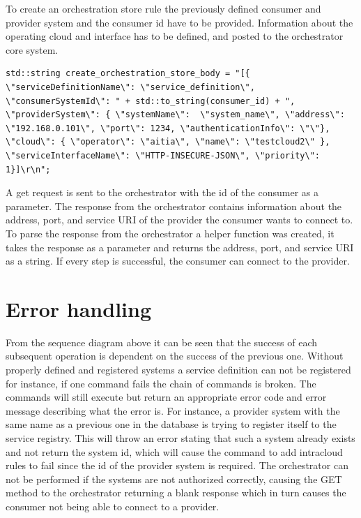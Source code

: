 To create an orchestration store rule the previously defined consumer and provider system and the consumer id have to be provided. 
Information about the operating cloud and interface has to be defined, and posted to the orchestrator core system.
\begin{lstlisting}[style=CStyle]
std::string create_orchestration_store_body = "[{ \"serviceDefinitionName\": \"service_definition\", \"consumerSystemId\": " + std::to_string(consumer_id) + ", \"providerSystem\": { \"systemName\":  \"system_name\", \"address\": \"192.168.0.101\", \"port\": 1234, \"authenticationInfo\": \"\"}, \"cloud\": { \"operator\": \"aitia\", \"name\": \"testcloud2\" }, \"serviceInterfaceName\": \"HTTP-INSECURE-JSON\", \"priority\": 1}]\r\n";
\end{lstlisting}
A get request is sent to the orchestrator with the id of the consumer as a parameter.
The response from the orchestrator contains information about the address, port, and service URI of the provider the consumer wants to connect to.
To parse the response from the orchestrator a helper function was created, it takes the response as a parameter and returns the address, port, and service URI as a string.
If every step is successful, the consumer can connect to the provider.

\section{Error handling}
From the sequence diagram above it can be seen that the success of each subsequent operation is dependent on the success of the previous one.
Without properly defined and registered systems a service definition can not be registered for instance, if one command fails the chain of commands is broken.
The commands will still execute but return an appropriate error code and error message describing what the error is.
For instance, a provider system with the same name as a previous one in the database is trying to register itself to the service registry.
This will throw an error stating that such a system already exists and not return the system id, which will cause the command to add intracloud rules to fail since the id of the provider system is required. 
The orchestrator can not be performed if the systems are not authorized correctly, causing the GET method to the orchestrator returning a blank response which in turn causes the consumer not being able to connect to a provider.



